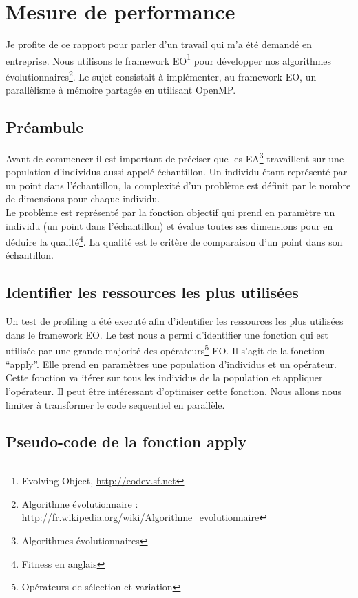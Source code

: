 \section{Mesure de performance}

Je profite de ce rapport pour parler d'un travail qui m'a été demandé en entreprise. Nous utilisons le framework EO\footnote{Evolving Object, \url{http://eodev.sf.net}} pour développer nos algorithmes évolutionnaires\footnote{Algorithme évolutionnaire : \url{http://fr.wikipedia.org/wiki/Algorithme_evolutionnaire}}. Le sujet consistait à implémenter, au framework EO, un parallèlisme à mémoire partagée en utilisant OpenMP.

\subsection{Préambule}

Avant de commencer il est important de préciser que les EA\footnote{Algorithmes évolutionnaires} travaillent sur une population d'individus aussi appelé échantillon. Un individu étant représenté par un point dans l'échantillon, la complexité d'un problème est définit par le nombre de dimensions pour chaque individu.\\

Le problème est représenté par la fonction objectif qui prend en paramètre un individu (un point dans l'échantillon) et évalue toutes ses dimensions pour en déduire la qualité\footnote{Fitness en anglais}. La qualité est le critère de comparaison d'un point dans son échantillon.

\subsection{Identifier les ressources les plus utilisées}

Un test de profiling a été executé afin d'identifier les ressources les plus utilisées dans le framework EO. Le test nous a permi d'identifier une fonction qui est utilisée par une grande majorité des opérateurs\footnote{Opérateurs de sélection et variation} EO. Il s'agit de la fonction ``apply''. Elle prend en paramètres une population d'individus et un opérateur. Cette fonction va itérer sur tous les individus de la population et appliquer l'opérateur. Il peut être intéressant d'optimiser cette fonction. Nous allons nous limiter à transformer le code sequentiel en parallèle.

\subsection{Pseudo-code de la fonction apply}

